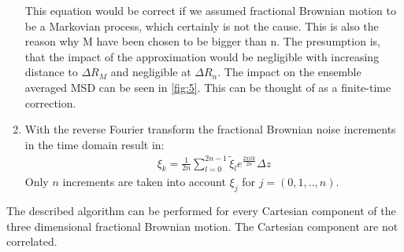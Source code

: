\documentclass[
  a4paper,BCOR10mm,oneside,
  bibtotoc,idxtotoc,
  headsepline,footsepline,%
  fleqn,openbib
]{scrbook}
\begin{document}
\begin{enumerate}
\begin{figure}
\end{figure}
This equation would be correct if we assumed fractional Brownian motion to be a Markovian process, which certainly is not the cause. This is also the reason why M have been chosen to be bigger than n. The presumption is, that the impact of the approximation would be negligible with increasing distance to $\Delta R_{M}$ and negligible at $\Delta R_{n}$. The impact on the ensemble averaged MSD can be seen in \cref{fig:5}. This can be thought of as a finite-time correction.

 \item With the reverse Fourier transform the fractional Brownian noise increments in the time domain result in:
 \begin{align}
 \xi_{k}= \frac{1}{2n} \sum_{l=0}^{2n-1}  \tilde{\xi}_l e^{\frac{2 \pi i l k }{2n}} \Delta z
 \end{align}
Only $n$ increments are taken into account $\xi_{j}$ for $j=(0,1,..,n)$.
\end{enumerate}
The described algorithm can be performed for every Cartesian component of the three dimensional fractional Brownian motion. The Cartesian component are not correlated.
\end{document}
